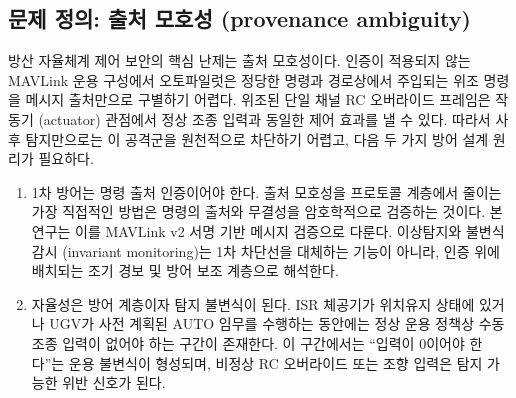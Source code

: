 \subsection{문제 정의: 출처 모호성 (provenance ambiguity)}

방산 자율체계 제어 보안의 핵심 난제는 출처 모호성이다. 인증이 적용되지 않는 MAVLink 운용 구성에서 오토파일럿은 정당한 명령과 경로상에서 주입되는 위조 명령을 메시지 출처만으로 구별하기 어렵다. 위조된 단일 채널 RC 오버라이드 프레임은 작동기 (actuator) 관점에서 정상 조종 입력과 동일한 제어 효과를 낼 수 있다. 따라서 사후 탐지만으로는 이 공격군을 원천적으로 차단하기 어렵고, 다음 두 가지 방어 설계 원리가 필요하다.

\begin{enumerate}[leftmargin=*]
    \item 1차 방어는 명령 출처 인증이어야 한다. 출처 모호성을 프로토콜 계층에서 줄이는 가장 직접적인 방법은 명령의 출처와 무결성을 암호학적으로 검증하는 것이다. 본 연구는 이를 MAVLink v2 서명 기반 메시지 검증으로 다룬다. 이상탐지와 불변식 감시 (invariant monitoring)는 1차 차단선을 대체하는 기능이 아니라, 인증 위에 배치되는 조기 경보 및 방어 보조 계층으로 해석한다.

    \item 자율성은 방어 계층이자 탐지 불변식이 된다. ISR 체공기가 위치유지 상태에 있거나 UGV가 사전 계획된 AUTO 임무를 수행하는 동안에는 정상 운용 정책상 수동 조종 입력이 없어야 하는 구간이 존재한다. 이 구간에서는 ``입력이 0이어야 한다''는 운용 불변식이 형성되며, 비정상 RC 오버라이드 또는 조향 입력은 탐지 가능한 위반 신호가 된다.
\end{enumerate}

